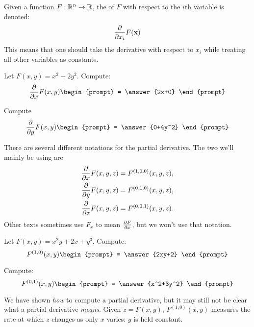\documentclass{ximera}
\begin{document}
\begin{definition}
  Given a function $F:\R^n\to\R$, the  of $F$
  with respect to the $i$th variable is denoted:
  \[
  \pp{x_i} F(\vec{x})
  \]
  This means that one should take the derivative with respect to $x_i$
  while treating all other variables as constants. 
\end{definition}

\begin{question}
  Let $F(x,y) = x^2+2y^2$. Compute:
  \[
  \pp{x} F(x,y)
  \begin{prompt}
    = \answer{2x+0}
  \end{prompt}
  \]
  \begin{question}
    Compute
  \[
  \pp{y} F(x,y)
  \begin{prompt}
    = \answer{0+4y^2}
  \end{prompt}
  \]
  \end{question}
\end{question}


\begin{definition}
  There are several different notations for the partial derivative.
  The two we'll mainly be using are
  \begin{align*}
    \pp{x} F(x,y,z) &= F^{(1,0,0)}(x,y,z),\\
    \pp{y} F(x,y,z) &= F^{(0,1,0)}(x,y,z),\\
    \pp{z} F(x,y,z) &= F^{(0,0,1)}(x,y,z).
  \end{align*}
  Other texts sometimes use $F_x$ to mean $\pp[F]{x}$, but we won't
  use that notation.
\end{definition}

\begin{question}
  Let $F(x,y) = x^2y + 2x+y^3$. Compute:
  \[
  F^{(1,0)}(x,y)
  \begin{prompt}
    = \answer{2xy+2}
  \end{prompt}
  \]
  \begin{question}
    Compute:
  \[
  F^{(0,1)}(x,y)
  \begin{prompt}
    = \answer{x^2+3y^2}
  \end{prompt}
  \]
  \end{question}
\end{question}

We have shown \textit{how} to compute a partial derivative, but it may
still not be clear what a partial derivative \textit{means}. Given
$z=F(x,y)$, $F^{(1,0)}(x,y)$ measures the rate at which $z$ changes as
only $x$ varies: $y$ is held constant. 
\end{document}
